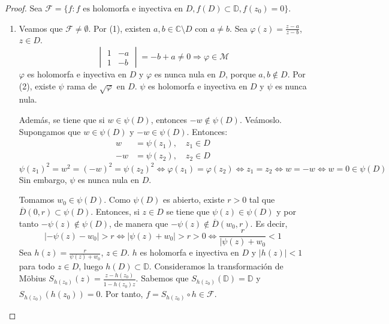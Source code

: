 \begin{proof}
    Sea $\mathcal{F} = \{f : f \text{ es holomorfa e inyectiva en } D, f(D) \subset \mathbb{D}, f(z_0) = 0\}$.
    \begin{enumerate}
        \item Veamos que $\mathcal{F} \neq \emptyset$.
              Por (1), existen $a, b \in \mathbb{C} \setminus D$ con $a \neq b$.
              Sea $\varphi(z) = \frac{z-a}{z-b}$, $z \in D$.
              $$\begin{vmatrix}
                      1 & -a \\
                      1 & -b
                  \end{vmatrix} = -b + a \neq 0 \Rightarrow \varphi \in \mathcal{M}$$
              $\varphi$ es holomorfa e inyectiva en $D$ y $\varphi$ es nunca nula en $D$, porque $a, b \notin D$.
              Por (2), existe $\psi$ rama de $\sqrt{\varphi}$ en $D$.
              $\psi$ es holomorfa e inyectiva en $D$ y $\psi$ es nunca nula.

              Además, se tiene que si $w \in \psi(D)$, entonces $-w \notin \psi(D)$.
              Veámoslo.
              Supongamos que $w \in \psi(D)$ y $-w \in \psi(D)$.
              Entonces:
              \begin{align*}
                  w  & = \psi(z_1), \quad z_1 \in D \\
                  -w & = \psi(z_2), \quad z_2 \in D
              \end{align*}
              $$\psi(z_1)^2 = w^2 = (-w)^2 = \psi(z_2)^2 \Leftrightarrow \varphi(z_1) = \varphi(z_2) \Leftrightarrow z_1 = z_2 \Leftrightarrow w = -w \Leftrightarrow w = 0 \in \psi(D)$$
              Sin embargo, $\psi$ es nunca nula en $D$.

              Tomamos $w_0 \in \psi(D)$.
              Como $\psi(D)$ es abierto, existe $r > 0$ tal que $\overline{D}(0, r) \subset \psi(D)$.
              Entonces, si $z \in D$ se tiene que $\psi(z) \in \psi(D)$ y por tanto $-\psi(z) \notin \psi(D)$, de manera que $-\psi(z) \notin \overline{D}(w_0, r)$.
              Es decir,
              $$|-\psi(z)-w_0| > r \Leftrightarrow |\psi(z)+w_0| > r > 0 \Leftrightarrow \frac{r}{|\psi(z)+w_0} < 1$$
              Sea $h(z) = \frac{r}{\psi(z)+w_0}$, $z \in D$.
              $h$ es holomorfa e inyectiva en $D$ y $|h(z)| < 1$ para todo $z \in D$, luego $h(D) \subset \mathbb{D}$.
              Consideramos la transformación de Möbius $S_{h(z_0)}(z) = \frac{z-h(z_0)}{1-\overline{h(z_0)}z}$.
              Sabemos que $S_{h(z_0)}(\mathbb{D}) = \mathbb{D}$ y $S_{h(z_0)}(h(z_0)) = 0$.
              Por tanto, $f = S_{h(z_0)} \circ h \in \mathcal{F}$.


\end{enumerate}
\end{proof}
